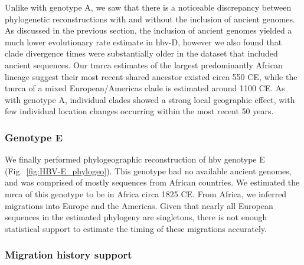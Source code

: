 Unlike with genotype A, we saw that there is a noticeable discrepancy between phylogenetic reconstructions with and without the inclusion of ancient genomes.
As discussed in the previous section, the inclusion of ancient genomes yielded a much lower evolutionary rate estimate in \gls{hbv}-D, however we also found that clade divergence times were substantially older in the dataset that included ancient sequences.
Our \gls{tmrca} estimates of the largest predominantly African lineage suggest their most recent shared ancestor existed circa 550 CE, while the \gls{tmrca} of a mixed European/Americas clade is estimated around 1100 CE.
As with genotype A, individual clades showed a strong local geographic effect, with few individual location changes occurring within the most recent 50 years.

\subsubsection{Genotype E}

We finally performed phylogeographic reconstruction of \gls{hbv} genotype E (Fig.~\ref{fig:HBV-E_phylogeo}).
This genotype had no available ancient genomes, and was comprised of mostly sequences from African countries.
We estimated the \gls{mrca} of this genotype to be in Africa circa 1825 CE.
From Africa, we inferred migrations into Europe and the Americas.
Given that nearly all European sequences in the estimated phylogeny are singletons, there is not enough statistical support to estimate the timing of these migrations accurately.

\subsubsection{Migration history support}

